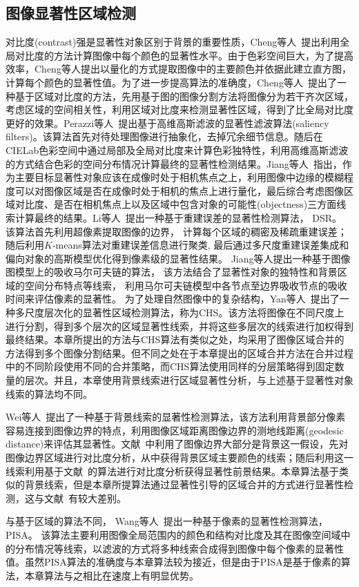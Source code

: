 \subsection{图像显著性区域检测}
\label{sec:SaliencyDetection}
对比度(contrast)强是显著性对象区别于背景的重要性质，Cheng等人~\cite{ChengPAMI}提出利用全局对比度的方法计算图像中每个颜色的显著性水平。由于色彩空间巨大，为了提高效率，Cheng等人提出以量化的方式提取图像中的主要颜色并依据此建立直方图，计算每个颜色的显著性值。为了进一步提高算法的准确度，Cheng等人~\cite{ChengPAMI}提出了一种基于区域对比度的方法，先用基于图的图像分割方法将图像分为若干齐次区域，考虑区域的空间相关性，利用区域对比度来检测显著性区域，得到了比全局对比度更好的效果。Perazzi等人~\cite{saliencyFilter}提出基于高维高斯滤波的显著性滤波算法(saliency filters)。该算法首先对待处理图像进行抽象化，去掉冗余细节信息。随后在CIELab色彩空间中通过局部及全局对比度来计算色彩独特性，利用高维高斯滤波的方式结合色彩的空间分布情况计算最终的显著性检测结果。Jiang等人~\cite{ufo}指出，作为主要目标显著性对象应该在成像时处于相机焦点之上，利用图像中边缘的模糊程度可以对图像区域是否在成像时处于相机的焦点上进行量化，最后综合考虑图像区域对比度、是否在相机焦点上以及区域中包含对象的可能性(objectness)三方面线索计算最终的结果。Li等人~\cite{DSR}提出一种基于重建误差的显著性检测算法， DSR。 该算法首先利用超像素提取图像的边界， 计算每个区域的稠密及稀疏重建误差； 随后利用$K$-means算法对重建误差信息进行聚类, 最后通过多尺度重建误差集成和偏向对象的高斯模型优化得到像素级的显著性结果。 Jiang等人\cite{MC}提出一种基于图像图模型上的吸收马尔可夫链的算法， 该方法结合了显著性对象的独特性和背景区域的空间分布特点等线索， 利用马尔可夫链模型中各节点至边界吸收节点的吸收时间来评估像素的显著性。 为了处理自然图像中的复杂结构，Yan等人~\cite{ECSSD}提出了一种多尺度层次化的显著性区域检测算法，称为CHS。该方法将图像在不同尺度上进行分割，得到多个层次的区域显著性线索，并将这些多层次的线索进行加权得到最终结果。本章所提出的方法与CHS算法有类似之处，均采用了图像区域合并的方法得到多个图像分割结果。但不同之处在于本章提出的区域合并方法在合并过程中的不同阶段使用不同的合并策略，而CHS算法使用同样的分层策略得到固定数量的层次。并且，本章使用背景线索进行区域显著性分析，与上述基于显著性对象线索的算法均不同。\par
Wei等人~\cite{geodesicDistance}提出了一种基于背景线索的显著性检测算法，该方法利用背景部分像素容易连接到图像边界的特点，利用图像区域距离图像边界的测地线距离(geodesic distance)来评估其显著性。文献~中利用了图像边界大部分是背景这一假设，先对图像边界区域进行对比度分析，从中获得背景区域主要颜色的线索；随后利用这一线索利用基于文献~的算法进行对比度分析获得显著性前景结果。本章算法基于类似的背景线索，但是本章所提算法通过显著性引导的区域合并的方式进行显著性检测，这与文献~有较大差别。\par
与基于区域的算法不同， Wang等人~\cite{PISA}提出一种基于像素的显著性检测算法， PISA。 该算法主要利用图像全局范围内的颜色和结构对比度及其在图像空间域中的分布情况等线索，以滤波的方式将多种线索合成得到图像中每个像素的显著性值。虽然PISA算法的准确度与本章算法较为接近，但是由于PISA是基于像素的算法，本章算法与之相比在速度上有明显优势。

